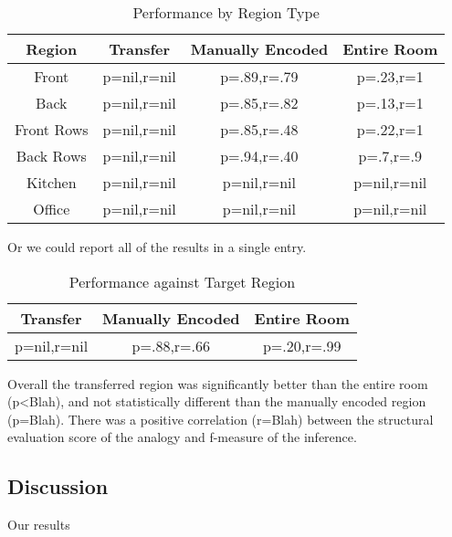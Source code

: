 \begin{table}
\small
\caption{Performance by Region Type}
\begin{tabular}{|c|c|c|c|}
\hline
Region & Transfer & Manually Encoded & Entire Room \\
\hline
Front & p=nil,r=nil & p=.89,r=.79 & p=.23,r=1 \\
Back & p=nil,r=nil & p=.85,r=.82 & p=.13,r=1 \\
Front Rows & p=nil,r=nil & p=.85,r=.48 & p=.22,r=1 \\
Back Rows & p=nil,r=nil & p=.94,r=.40 & p=.7,r=.9 \\
Kitchen & p=nil,r=nil & p=nil,r=nil & p=nil,r=nil \\
Office & p=nil,r=nil & p=nil,r=nil & p=nil,r=nil \\
\hline
\end{tabular}
\end{table}

Or we could report all of the results in a single entry.

\begin{table}
\small
\caption{Performance against Target Region}
\begin{tabular}{|c|c|c|}
\hline
Transfer & Manually Encoded & Entire Room \\
\hline
p=nil,r=nil & p=.88,r=.66 & p=.20,r=.99 \\
\hline
\end{tabular}
\end{table}


Overall the transferred region was significantly better than the entire room (p<Blah), and not statistically different than the manually encoded region (p=Blah). There was a positive correlation (r=Blah) between the structural evaluation score of the analogy and f-measure of the inference.


\subsection{Discussion}

Our results

